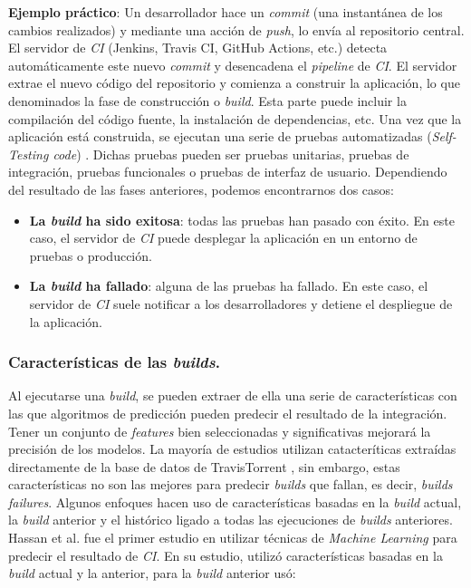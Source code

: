 \textbf{Ejemplo práctico}: Un desarrollador hace un \textit{commit} (una
instantánea de los cambios realizados) y mediante una acción de \textit{push}, lo envía al
repositorio central. El servidor de \textit{CI} \cite{9} (Jenkins, Travis CI, GitHub Actions,
etc.) detecta automáticamente este nuevo \textit{commit} y desencadena el \textit{pipeline} de
\textit{CI}. El servidor extrae el nuevo código del repositorio y comienza a construir la
aplicación, lo que denominados la fase de construcción o \textit{build}. Esta parte puede incluir
la compilación del código fuente, la instalación de dependencias, etc. Una vez que la aplicación
está construida, se ejecutan una serie de pruebas automatizadas (\textit{Self-Testing code})
\cite{10}. Dichas pruebas pueden ser pruebas unitarias, pruebas de integración, pruebas
funcionales o pruebas de interfaz de usuario. Dependiendo del resultado de las fases anteriores,
podemos encontrarnos dos casos:

\begin{itemize}
    \item \textbf{La \textit{build} ha sido exitosa}: todas las pruebas han pasado con éxito. En
          este caso, el servidor de \textit{CI} puede desplegar la aplicación en un entorno de
          pruebas o producción.
    \item \textbf{La \textit{build} ha fallado}: alguna de las pruebas ha fallado. En este caso,
          el servidor de \textit{CI} suele notificar a los desarrolladores y detiene el
          despliegue de la aplicación.
\end{itemize}


\subsubsection{Características de las \textit{builds}.} \label{sec:features}
Al ejecutarse una \textit{build}, se pueden extraer de ella una serie de características con las
que algoritmos de predicción pueden predecir el resultado de la integración. Tener un conjunto
de \textit{features} bien seleccionadas y significativas mejorará la precisión de los modelos.
La mayoría de estudios utilizan catacteríticas extraídas directamente de la base de datos de
TravisTorrent \cite{6}, sin embargo, estas características no son las mejores para predecir
\textit{builds} que fallan, es decir, \textit{builds failures}. Algunos enfoques \cite{6,7}
hacen uso de características basadas en la \textit{build} actual, la \textit{build} anterior y
el histórico ligado a todas las ejecuciones de \textit{builds} anteriores. Hassan et al. \cite{7}
fue el primer estudio en utilizar técnicas de \textit{Machine Learning} para predecir el resultado
de \textit{CI}. En su estudio, utilizó características basadas en la \textit{build} actual y la
anterior, para la \textit{build} anterior usó:

